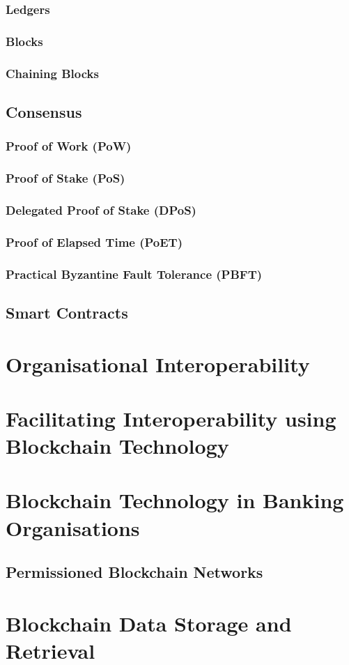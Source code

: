 \subsubsection{Ledgers}

\subsubsection{Blocks}

\subsubsection{Chaining Blocks}

\subsection{Consensus}

\subsubsection{Proof of Work (PoW)}

\subsubsection{Proof of Stake (PoS)}

\subsubsection{Delegated Proof of Stake (DPoS)}

\subsubsection{Proof of Elapsed Time (PoET)}

\subsubsection{Practical Byzantine Fault Tolerance (PBFT)}

\subsection{Smart Contracts}

\section{Organisational Interoperability}

\section{Facilitating Interoperability using Blockchain Technology}

\section{Blockchain Technology in Banking Organisations}

\subsection{Permissioned Blockchain Networks}

\section{Blockchain Data Storage and Retrieval}